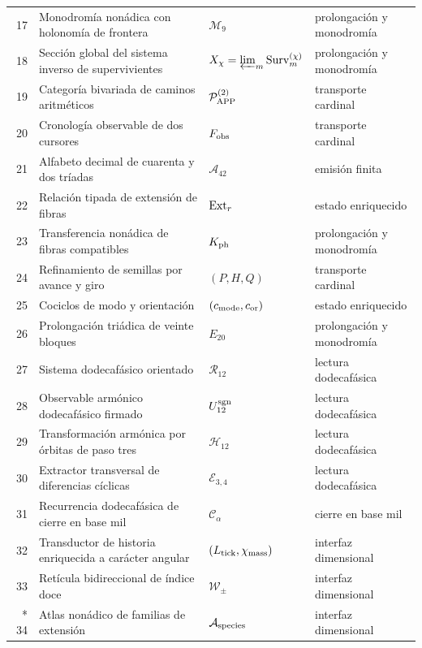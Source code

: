 \begin{longtable}{@{}r >{\raggedright\arraybackslash}p{}
  >{\raggedright\arraybackslash}p{}
  >{\raggedright\arraybackslash}p{}@{}}
17 & Monodromía nonádica con holonomía de frontera
  & \(\mathcal M_9\) & prolongación y monodromía \\
18 & Sección global del sistema inverso de supervivientes
  & \(X_\chi=\varprojlim_m{\rm Surv}^{(\chi)}_m\)
  & prolongación y monodromía \\
19 & Categoría bivariada de caminos aritméticos
  & \(\mathcal P_{\rm APP}^{(2)}\) & transporte cardinal \\
20 & Cronología observable de dos cursores
  & \(F_{\rm obs}\) & transporte cardinal \\
21 & Alfabeto decimal de cuarenta y dos tríadas
  & \(\mathcal A_{42}\) & emisión finita \\
22 & Relación tipada de extensión de fibras
  & \({\rm Ext}_r\) & estado enriquecido \\
23 & Transferencia nonádica de fibras compatibles
  & \(K_{\rm ph}\) & prolongación y monodromía \\
24 & Refinamiento de semillas por avance y giro
  & \((P,H,Q)\) & transporte cardinal \\
25 & Cociclos de modo y orientación
  & \((c_{\rm mode},c_{\rm or})\) & estado enriquecido \\
26 & Prolongación triádica de veinte bloques
  & \(E_{20}\) & prolongación y monodromía \\
27 & Sistema dodecafásico orientado
  & \(\mathcal R_{12}\) & lectura dodecafásica \\
28 & Observable armónico dodecafásico firmado
  & \(U_{12}^{\rm sgn}\) & lectura dodecafásica \\
29 & Transformación armónica por órbitas de paso tres
  & \(\mathcal H_{12}\) & lectura dodecafásica \\
30 & Extractor transversal de diferencias cíclicas
  & \(\mathcal E_{3,4}\) & lectura dodecafásica \\
31 & Recurrencia dodecafásica de cierre en base mil
  & \(\mathcal C_\alpha\) & cierre en base mil \\
32 & Transductor de historia enriquecida a carácter angular
  & \((L_{\rm tick},\chi_{\rm mass})\) & interfaz dimensional \\
33 & Retícula bidireccional de índice doce
  & \(\mathcal W_{\pm}\) & interfaz dimensional \\*
34 & Atlas nonádico de familias de extensión
  & \(\mathcal A_{\rm species}\) & interfaz dimensional \\
\bottomrule
\end{longtable}
\endgroup

